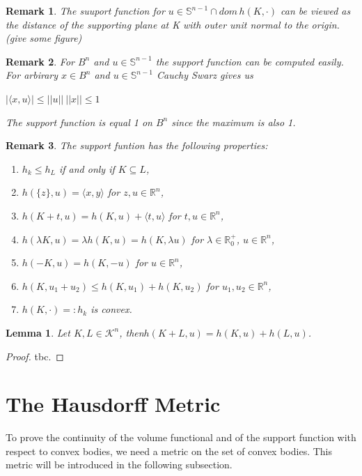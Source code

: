 \documentclass[a4paper]{book}
\newtheorem{lemma}[theorem]{Lemma}%
\newtheorem{remark}{Remark}%
\begin{document}
\begin{remark}
	The suuport function for $u\in\mathbb{S}^{n-1}\cap dom\,h(K,\cdot)$ can be viewed as the distance of the supporting plane at K with outer unit normal to the origin.(give some figure)
\end{remark}

\begin{remark}
	For $B^{n}$ and $u\in\mathbb{S}^{n-1}$ the support function can be computed easily. For arbirary $x\in B^{n}$ and $u\in\mathbb{S}^{n-1}$ Cauchy Swarz gives us
	\begin{center}
		$|\langle x,u\rangle|\leq||u||\:||x||\leq1$
	\end{center}
	The support function is equal 1 on $B^{n}$ since the maximum is also 1.
\end{remark}

\begin{remark}
	The support funtion has the following properties:
	\begin{enumerate}
		\item $h_{k}\leq h_{L}$ if and only if $K\subseteq L$,
		\item $h(\{z\},u)=\langle x,y\rangle$ for $z,u\in\mathbb{R}^{n}$,
		\item $h(K+t,u)=h(K,u)+\langle t,u\rangle$ for $t,u\in\mathbb{R}^{n}$,
		\item $h(\lambda K, u)=\lambda h(K,u)=h(K,\lambda u)$ for $\lambda\in\mathbb{R}_{0}^{+}$, $u\in\mathbb{R}^{n}$,
		\item $h(-K,u)=h(K,-u)$ for $u\in\mathbb{R}^{n}$,
		\item $h(K,u_{1}+u_{2})\leq h(K,u_{1})+h(K,u_{2})$ for $u_{1},u_{2}\in\mathbb{R}^{n}$,
		\item $h(K,\cdot)=: h_{k}$ is convex.
	\end{enumerate}
\end{remark}

\begin{lemma}
	Let $K,L\in\mathscr{K}^{n}$, then$h(K+L,u)= h(K,u)+h(L,u)$.
\end{lemma}
\begin{proof}
	tbc.
\end{proof}

\section{The Hausdorff Metric}
To prove the continuity of the volume functional and of the support function with respect to convex bodies, we need a metric on the set of convex bodies. This metric will be introduced in the following subsection.
\end{document}
